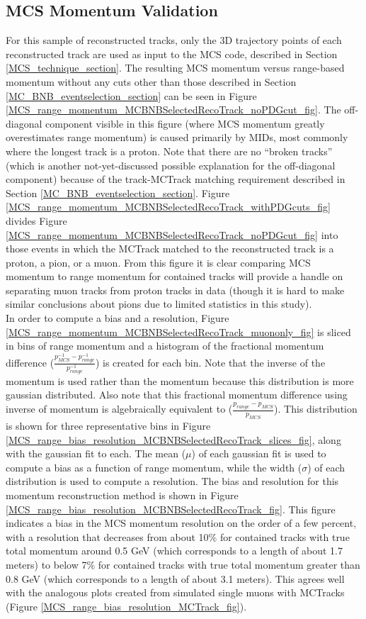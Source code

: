 \subsection{MCS Momentum Validation}\label{MCS_Momentum_Validation_MCBNBSelectedRecoTrack_section}
For this sample of reconstructed tracks, only the 3D trajectory points of each reconstructed track are used as input to the MCS code, described in Section \ref{MCS_technique_section}. The resulting MCS momentum versus range-based momentum without any cuts other than those described in Section \ref{MC_BNB_eventselection_section} can be seen in Figure \ref{MCS_range_momentum_MCBNBSelectedRecoTrack_noPDGcut_fig}. The off-diagonal component visible in this figure (where MCS momentum greatly overestimates range momentum) is caused primarily by MIDs, most commonly where the longest track is a proton. Note that there are no ``broken tracks'' (which is another not-yet-discussed possible explanation for the off-diagonal component) because of the track-{\sc MCTrack} matching requirement described in Section \ref{MC_BNB_eventselection_section}. Figure \ref{MCS_range_momentum_MCBNBSelectedRecoTrack_withPDGcuts_fig} divides Figure \ref{MCS_range_momentum_MCBNBSelectedRecoTrack_noPDGcut_fig} into those events in which the MCTrack matched to the reconstructed track is a proton, a pion, or a muon. From this figure it is clear comparing MCS momentum to range momentum for contained tracks will provide a handle on separating muon tracks from proton tracks in data (though it is hard to make similar conclusions about pions due to limited statistics in this study).\\

In order to compute a bias and a resolution, Figure \ref{MCS_range_momentum_MCBNBSelectedRecoTrack_muononly_fig} is sliced in bins of range momentum and a histogram of the fractional momentum difference ($\frac{p_{MCS}^{-1} - p_{range}^{-1}}{p_{range}^{-1}}$) is created for each bin. Note that the inverse of the momentum is used rather than the momentum because this distribution is more gaussian distributed. Also note that this fractional momentum difference using inverse of momentum is algebraically equivalent to ($\frac{p_{range} - p_{MCS}}{p_{MCS}}$). This distribution is shown for three representative bins in Figure \ref{MCS_range_bias_resolution_MCBNBSelectedRecoTrack_slices_fig}, along with the gaussian fit to each.  The mean ($\mu$) of each gaussian fit is used to compute a bias as a function of range momentum, while the width ($\sigma$) of each distribution is used to compute a resolution. The bias and resolution for this momentum reconstruction method is shown in Figure \ref{MCS_range_bias_resolution_MCBNBSelectedRecoTrack_fig}. This figure indicates a bias in the MCS momentum resolution on the order of a few percent, with a resolution that decreases from about 10\% for contained tracks with true total momentum around 0.5 GeV (which corresponds to a length of about 1.7 meters) to below 7\% for contained tracks with true total momentum greater than 0.8 GeV (which corresponds to a length of about 3.1 meters). This agrees well with the analogous plots created from simulated single muons with {\sc MCTracks} (Figure \ref{MCS_range_bias_resolution_MCTrack_fig}).



